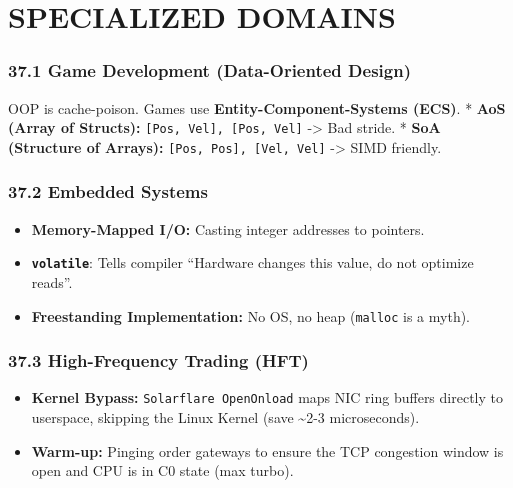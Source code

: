 \hypertarget{specialized-domains}{%
\chapter{SPECIALIZED DOMAINS}\label{specialized-domains}}

\hypertarget{game-development-data-oriented-design}{%
\subsection{37.1 Game Development (Data-Oriented
Design)}\label{game-development-data-oriented-design}}

OOP is cache-poison. Games use \textbf{Entity-Component-Systems (ECS)}.
* \textbf{AoS (Array of Structs):}
\passthrough{\lstinline![Pos, Vel], [Pos, Vel]!} -\textgreater{} Bad
stride. * \textbf{SoA (Structure of Arrays):}
\passthrough{\lstinline![Pos, Pos], [Vel, Vel]!} -\textgreater{} SIMD
friendly.

\hypertarget{embedded-systems}{%
\subsection{37.2 Embedded Systems}\label{embedded-systems}}

\begin{itemize}
\tightlist
\item
  \textbf{Memory-Mapped I/O:} Casting integer addresses to pointers.
\item
  \textbf{\passthrough{\lstinline!volatile!}}: Tells compiler ``Hardware
  changes this value, do not optimize reads''.
\item
  \textbf{Freestanding Implementation:} No OS, no heap
  (\passthrough{\lstinline!malloc!} is a myth).
\end{itemize}

\hypertarget{high-frequency-trading-hft}{%
\subsection{37.3 High-Frequency Trading
(HFT)}\label{high-frequency-trading-hft}}

\begin{itemize}
\tightlist
\item
  \textbf{Kernel Bypass:}
  \passthrough{\lstinline!Solarflare OpenOnload!} maps NIC ring buffers
  directly to userspace, skipping the Linux Kernel (save
  \textasciitilde2-3 microseconds).
\item
  \textbf{Warm-up:} Pinging order gateways to ensure the TCP congestion
  window is open and CPU is in C0 state (max turbo).
\end{itemize}

